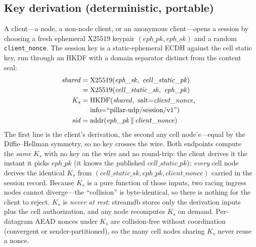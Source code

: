 \documentclass[10pt,twocolumn]{article}
\newcommand{\code}[1]{\texttt{\small #1}}
\newcommand{\Ks}{\ensuremath{K_s}}
\begin{document}
\subsection{Key derivation (deterministic, portable)}
A client---a node, a non-node client, or an anonymous client---opens a session by
choosing a fresh ephemeral X25519 keypair $(\mathit{eph\_pk},\mathit{eph\_sk})$
and a random \code{client\_nonce}. The session key is a static-ephemeral ECDH
against the cell static key, run through an HKDF with a domain separator distinct
from the content seal:
\begin{align*}
\mathit{shared} &= \mathrm{X25519}(\mathit{eph\_sk},\ \mathit{cell\_static\_pk})\\[-1pt]
   &= \mathrm{X25519}(\mathit{cell\_static\_sk},\ \mathit{eph\_pk})\\
\Ks &= \mathrm{HKDF}(\mathit{shared},\ \text{salt}{=}\mathit{client\_nonce},\\[-1pt]
    &\hphantom{{}={}} \text{info}{=}\text{``pillar-udp/session/v1''})\\
\mathit{sid} &= \mathrm{addr}(\mathit{eph\_pk}\,\|\,\mathit{client\_nonce})
\end{align*}
The first line is the client's derivation, the second any cell node's---equal by
the Diffie--Hellman symmetry, so no key crosses the wire.
Both endpoints compute the \emph{same} \Ks{} with no key on the wire and no
round-trip: the client derives it the instant it picks $\mathit{eph\_pk}$ (it
knows the published $\mathit{cell\_static\_pk}$); \emph{every} cell node derives
the identical \Ks{} from $(\mathit{cell\_static\_sk},\mathit{eph\_pk},
\mathit{client\_nonce})$ carried in the session record. Because \Ks{} is a pure
function of those inputs, two racing ingress nodes cannot diverge---the
``collision'' is byte-identical, so there is nothing for the client to reject.
\Ks{} is \emph{never at rest}: streamdb stores only the derivation inputs plus the
cell authorization, and any node recomputes \Ks{} on demand. Per-datagram AEAD
nonces under \Ks{} are collision-free without coordination (convergent or
sender-partitioned), so the many cell nodes sharing \Ks{} never reuse a nonce.
\end{document}
